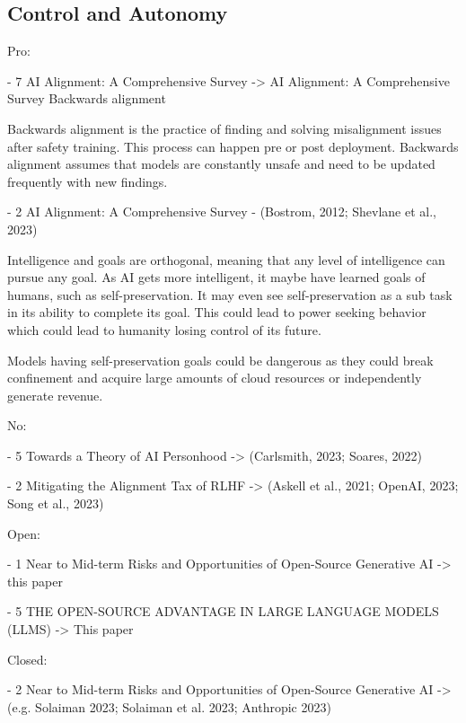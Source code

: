 \subsection{Control and Autonomy}

Pro:

- 7 AI Alignment: A Comprehensive Survey -> AI Alignment: A Comprehensive Survey
Backwards alignment
\citep{ji_ai_2023}

Backwards alignment is the practice of finding and solving misalignment issues after safety training. This process can happen pre or post deployment. Backwards alignment assumes that models are constantly unsafe and need to be updated frequently with new findings.

- 2 AI Alignment: A Comprehensive Survey - (Bostrom, 2012; Shevlane et al., 2023)
\citep{bostrom_superintelligent_2012}

Intelligence and goals are orthogonal, meaning that any level of intelligence can pursue any goal. As AI gets more intelligent, it maybe have learned goals of humans, such as self-preservation. It may even see self-preservation as a sub task in its ability to complete its goal. This could lead to power seeking behavior which could lead to humanity losing control of its future.

\citep{shevlane_model_2023}

Models having self-preservation goals could be dangerous as they could break confinement and acquire large amounts of cloud resources or independently generate revenue.

No:

- 5 Towards a Theory of AI Personhood -> (Carlsmith, 2023; Soares, 2022)
\citep{carlsmith_scheming_2023}



\citep{soares_central_2022}

- 2 Mitigating the Alignment Tax of RLHF -> (Askell et al., 2021; OpenAI, 2023; Song et al., 2023)
\citep{askell_general_2021}
\citep{openai_gpt_4_2023}
\citep{song_reward_2023}

Open: 

- 1 Near to Mid-term Risks and Opportunities of Open-Source Generative AI -> this paper
\citep{eiras_near_2024}

- 5 THE OPEN-SOURCE ADVANTAGE IN LARGE LANGUAGE MODELS (LLMS) -> This paper
\citep{manchanda_open_2025}

Closed:

- 2 Near to Mid-term Risks and Opportunities of Open-Source Generative AI -> (e.g. Solaiman 2023; Solaiman et al. 2023; Anthropic 2023)
\citep{solaiman_gradient_2023}
\citep{solaiman_evaluating_2024}


